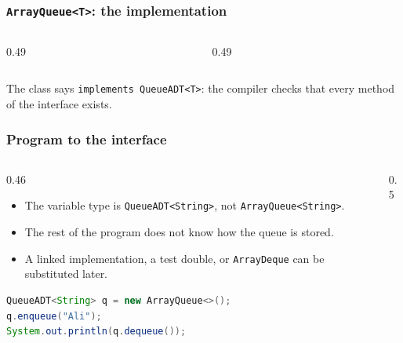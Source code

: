 \documentclass[aspectratio=169,10pt,compress]{beamer}
\begin{document}
\begin{frame}[t,fragile] \frametitle{\texttt{ArrayQueue<T>}: the implementation}
  \begin{columns}[T]
    \begin{column}{0.49\textwidth}
    \end{column}
    \begin{column}{0.49\textwidth}
    \end{column}
  \end{columns}
  \small The class says \texttt{implements QueueADT<T>}: the compiler checks that every method of the interface exists.
\end{frame}




\begin{frame}[t,fragile] \frametitle{Program to the interface}
  \begin{columns}[T]
    \begin{column}{0.46\textwidth}
      \begin{itemize}\small
        \item The variable type is \texttt{QueueADT<String>}, not \texttt{ArrayQueue<String>}.
        \item The rest of the program does not know how the queue is stored.
        \item A linked implementation, a test double, or \texttt{ArrayDeque} can be substituted later.
      \end{itemize}
      \vspace{0.3em}


\begin{lstlisting}[style=codesnippet, language=Java, basicstyle=\ttfamily\scriptsize]
QueueADT<String> q = new ArrayQueue<>();
q.enqueue("Ali");
System.out.println(q.dequeue());
\end{lstlisting}


    \end{column}
    \begin{column}{0.5\textwidth}
    \end{column}
  \end{columns}
\end{frame}
\end{document}
